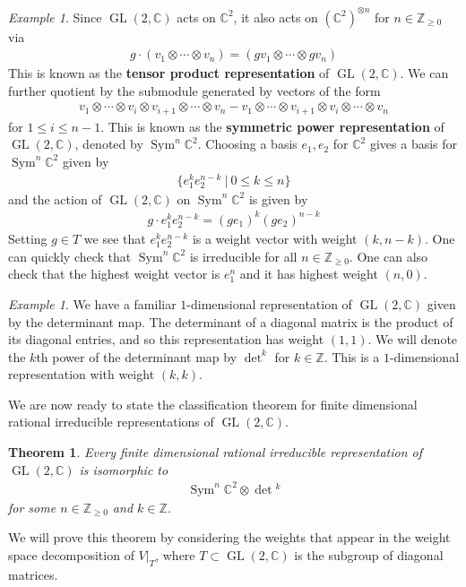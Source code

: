 \documentclass[manuscript, printscheme]{aomart}
\theoremstyle{plain} %
\newtheorem{theorem}[equation]{Theorem}
\theoremstyle{definition}
\theoremstyle{remark}
\newtheorem{example}[equation]{Example}
\newcommand{\st}{\ \vert \ }
\DeclareMathOperator{\GL}{GL}
\DeclareMathOperator{\Sym}{Sym}
\newcommand{\C}{\mathbb{C}}
\newcommand{\Z}{\mathbb{Z}}
\newcommand{\set}[1]{\{#1\}}
\begin{document}
\begin{example}
	Since $\GL(2,\C)$ acts on $\C^2$, it also acts on $(\C^2)^{\otimes n}$ for $n\in \Z_{\geq 0}$ via \begin{align*}
		g\cdot (v_1\otimes \cdots \otimes v_n) = (gv_1\otimes \cdots \otimes gv_n)
	\end{align*} This is known as the \textbf{tensor product representation} of $\GL(2,\C)$. We can further
	quotient by the submodule generated by vectors of the form \begin{align*}
		v_1\otimes \cdots \otimes v_i \otimes v_{i+1} \otimes \cdots \otimes v_n - v_1\otimes \cdots \otimes v_{i+1} \otimes v_i \otimes \cdots \otimes v_n
	\end{align*} for $1\leq i \leq n-1$. This is known as the \textbf{symmetric power representation} of $\GL(2,\C)$, denoted by $\Sym^n\C^2$.
	Choosing a basis $e_1,e_2$ for $\C^2$ gives a basis for $\Sym^n\C^2$ given by \begin{align*}
		\set{e_1^ke_2^{n-k} \st 0\leq k \leq n}
	\end{align*} and the action of $\GL(2,\C)$ on $\Sym^n\C^2$ is given by \begin{align*}
		g\cdot e_1^ke_2^{n-k} = (ge_1)^k(ge_2)^{n-k}
	\end{align*} Setting $g\in T$ we see that $e_1^ke_2^{n-k}$ is a weight vector with weight $(k,n-k)$. One
	can quickly check that $\Sym^n\C^2$ is irreducible for all $n\in \Z_{\geq 0}$. One can also check
	that the highest weight vector is $e_1^n$ and it has highest weight $(n,0)$.
\end{example}

\begin{example}
	We have a familiar $1$-dimensional representation of $\GL(2,\C)$ given by the determinant map. The determinant of a diagonal matrix is the product of its diagonal entries,
	and so this representation has weight $(1,1)$. We will denote
	the $k$th power of the determinant map by $\det^k$ for $k\in\Z$. This is a $1$-dimensional representation with weight $(k,k)$.
\end{example}

We are now ready to state the classification theorem for finite dimensional rational irreducible representations of $\GL(2,\C)$.
\begin{theorem}
	Every finite dimensional rational irreducible representation of $\GL(2,\C)$ is isomorphic to \begin{align*}
		\Sym^n\C^2 \otimes \det{}^k
	\end{align*} for some $n\in \Z_{\geq 0}$ and $k\in \Z$.
\end{theorem}
We will prove this theorem by considering the weights that appear in the weight space decomposition of $V\vert_{T}$, where $T\subset \GL(2,\C)$ is the subgroup of diagonal matrices.
\end{document}

